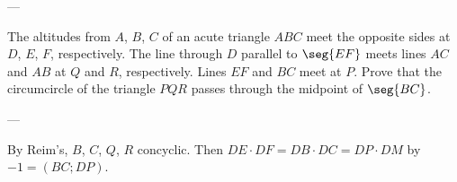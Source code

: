 
---

The altitudes from $A$, $B$, $C$ of an acute triangle $ABC$ meet the opposite sides at $D$, $E$, $F$, respectively. The line through $D$ parallel to $\seg{EF}$ meets lines $AC$ and $AB$ at $Q$ and $R$, respectively. Lines $EF$ and $BC$ meet at $P$. Prove that the circumcircle of the triangle $PQR$ passes through the midpoint of $\seg{BC}$.

---

By Reim's, $B$, $C$, $Q$, $R$ concyclic. Then $DE\cdot DF=DB\cdot DC=DP\cdot DM$ by $-1=(BC;DP)$.
